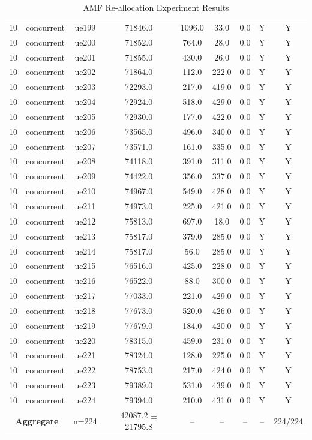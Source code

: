 \begin{table}[ht]
\begin{tabular}{|c|c|c|c|c|c|c|c|c|}
10 & concurrent & ue199 & 71846.0 & 1096.0 & 33.0 & 0.0 & Y & Y \\
10 & concurrent & ue200 & 71852.0 & 764.0 & 28.0 & 0.0 & Y & Y \\
10 & concurrent & ue201 & 71855.0 & 430.0 & 26.0 & 0.0 & Y & Y \\
10 & concurrent & ue202 & 71864.0 & 112.0 & 222.0 & 0.0 & Y & Y \\
10 & concurrent & ue203 & 72293.0 & 217.0 & 419.0 & 0.0 & Y & Y \\
10 & concurrent & ue204 & 72924.0 & 518.0 & 429.0 & 0.0 & Y & Y \\
10 & concurrent & ue205 & 72930.0 & 177.0 & 422.0 & 0.0 & Y & Y \\
10 & concurrent & ue206 & 73565.0 & 496.0 & 340.0 & 0.0 & Y & Y \\
10 & concurrent & ue207 & 73571.0 & 161.0 & 335.0 & 0.0 & Y & Y \\
10 & concurrent & ue208 & 74118.0 & 391.0 & 311.0 & 0.0 & Y & Y \\
10 & concurrent & ue209 & 74422.0 & 356.0 & 337.0 & 0.0 & Y & Y \\
10 & concurrent & ue210 & 74967.0 & 549.0 & 428.0 & 0.0 & Y & Y \\
10 & concurrent & ue211 & 74973.0 & 225.0 & 421.0 & 0.0 & Y & Y \\
10 & concurrent & ue212 & 75813.0 & 697.0 & 18.0 & 0.0 & Y & Y \\
10 & concurrent & ue213 & 75817.0 & 379.0 & 285.0 & 0.0 & Y & Y \\
10 & concurrent & ue214 & 75817.0 & 56.0 & 285.0 & 0.0 & Y & Y \\
10 & concurrent & ue215 & 76516.0 & 425.0 & 228.0 & 0.0 & Y & Y \\
10 & concurrent & ue216 & 76522.0 & 88.0 & 300.0 & 0.0 & Y & Y \\
10 & concurrent & ue217 & 77033.0 & 221.0 & 429.0 & 0.0 & Y & Y \\
10 & concurrent & ue218 & 77673.0 & 520.0 & 426.0 & 0.0 & Y & Y \\
10 & concurrent & ue219 & 77679.0 & 184.0 & 420.0 & 0.0 & Y & Y \\
10 & concurrent & ue220 & 78315.0 & 459.0 & 231.0 & 0.0 & Y & Y \\
10 & concurrent & ue221 & 78324.0 & 128.0 & 225.0 & 0.0 & Y & Y \\
10 & concurrent & ue222 & 78753.0 & 217.0 & 424.0 & 0.0 & Y & Y \\
10 & concurrent & ue223 & 79389.0 & 531.0 & 439.0 & 0.0 & Y & Y \\
10 & concurrent & ue224 & 79394.0 & 210.0 & 431.0 & 0.0 & Y & Y \\
\multicolumn{2}{|c|}{\textbf{Aggregate}} & n=224 & 42087.2 $\pm$ 21795.8 & -- & -- & -- & -- & 224/224 \\
\hline
\end{tabular}
\caption{AMF Re-allocation Experiment Results}
\label{tab:amf_realloc}
\end{table}
